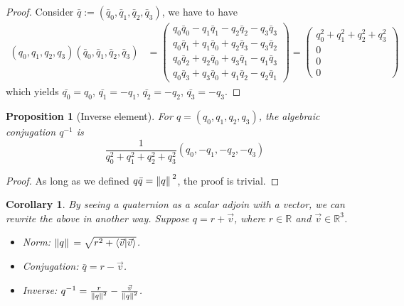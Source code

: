\documentclass[12pt]{article}
\newtheorem*{corollary}{Corollary}
\newtheorem*{proposition}{Proposition}
\begin{document}
    \begin{proof}
        Consider $\bar{q}:=(\bar{q}_0,\bar{q}_1,\bar{q}_2,\bar{q}_3)$, we have to have \begin{align*}
            (q_0,q_1,q_2,q_3)(\bar{q}_0,\bar{q}_1,\bar{q}_2,\bar{q}_3)&=\begin{pmatrix}
                q_0\bar{q}_0-q_1\bar{q}_1-q_2\bar{q}_2-q_3\bar{q}_3\\
                q_0\bar{q}_1+q_1\bar{q}_0+q_2\bar{q}_3-q_3\bar{q}_2\\
                q_0\bar{q}_2+q_2\bar{q}_0+q_3\bar{q}_1-q_1\bar{q}_3\\
                q_0\bar{q}_3+q_3\bar{q}_0+q_1\bar{q}_2-q_2\bar{q}_1
            \end{pmatrix}
            =\begin{pmatrix}
                q_0^2+q_1^2+q_2^2+q_3^2\\0\\0\\0
            \end{pmatrix}
        \end{align*}
        which yields $\bar{q_0}=q_0$, $\bar{q_1}=-q_1$, $\bar{q_2}=-q_2$, $\bar{q_3}=-q_3$.
    \end{proof}

    \begin{proposition}[Inverse element]
        For $q=(q_0,q_1,q_2,q_3)$, the algebraic conjugation $q^{-1}$ is $$\frac{1}{q_0^2+q_1^2+q_2^2+q_3^2}(q_0,-q_1,-q_2,-q_3)$$
    \end{proposition}
    
    \begin{proof}
        As long as we defined $q\bar{q}=\norm*{q}^2$, the proof is trivial.
    \end{proof}

    \begin{corollary}
        By seeing a quaternion as a scalar adjoin with a vector, we can rewrite the above in another way. Suppose $q=r+\vec{v}$, where $r\in \mathbb{R}$ and $\vec{v}\in\mathbb{R}^3$. \begin{itemize}
            \item Norm: $\norm*{q}=\sqrt{r^2+\innerproduct{\vec{v}}{\vec{v}}}$.
            \item Conjugation: $\bar{q}=r-\vec{v}$.
            \item Inverse: $q^{-1}=\frac{r}{\norm*{q}^2}-\frac{\vec{v}}{\norm*{q}^2}$.
        \end{itemize}
    \end{corollary}
\end{document}
